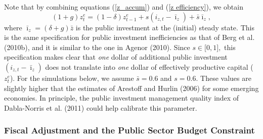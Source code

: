 \documentclass[11pt]{article}
\begin{document}
Note that by combining equations (\ref{z_accum}) and (\ref{z efficiency}),
we obtain%
\begin{equation}
(1+g)z_{t}^{e}=(1-\delta )z_{t-1}^{e}+s(i_{z,t}-\bar{\imath}_{z})+\bar{s}%
\bar{\imath}_{z},  \label{I_efficiency}
\end{equation}%
where $\bar{\imath}_{z}=(\delta +g)\bar{z}$ is the public investment at the
(initial) steady state$.$ This is the same specification for public
investment inefficiencies as that of Berg et al.\thinspace (2010b), and it
is similar to the one in Agenor (2010). Since $s\in \lbrack 0,1],$ this
specification makes clear that \textit{one} dollar of additional public
investment $(i_{z,t}-\bar{\imath}_{z})$ does not translate into \textit{one}
dollar of effectively productive capital ($z_{t}^{e}$). For the simulations
below, we assume $\bar{s}=0.6$ and $s=0.6.$ These values are slightly higher
that the estimates of Arestoff and Hurlin (2006) for some emerging
economies. In principle, the public investment management quality index of
Dabla-Norris et al. (2011) could help calibrate this parameter.

\subsubsection{Fiscal Adjustment and the Public Sector Budget Constraint}
\end{document}

